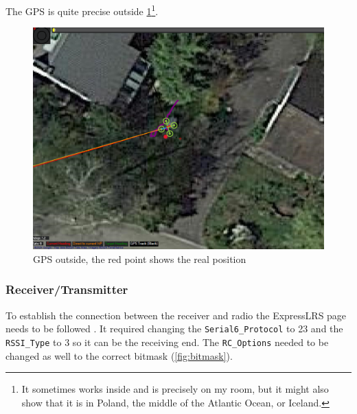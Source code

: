 \documentclass[svgnames]{article}
\begin{document}
	The GPS is quite precise outside \cref{fig:gpsoutside}\footnote{It sometimes works inside and is precisely on my room, but it might also show that it is in Poland, the middle of the Atlantic Ocean, or Iceland.}.
	
\begin{figure}[ht]
	\centering
	\includegraphics[scale=0.2]{pictures/GPS_Outsidewithdot}
	\caption{\gls{GPS} outside, the red point shows the real position}
	\label{fig:gpsoutside}
\end{figure}
	
	

	 
	\subsubsection{Receiver/Transmitter}
	To establish the connection between the receiver and radio the ExpressLRS page needs to be followed \cite{expresslrsorg}. It required changing the \lstinline|Serial6_Protocol| to 23 and the \lstinline|RSSI_Type| to 3 so it can be the receiving end. The \lstinline|RC_Options| needed to be changed as well to the correct bitmask (\cref{fig:bitmask}).
\end{document}
